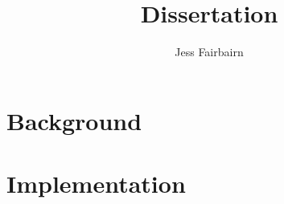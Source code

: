 \documentclass{article}
\author{Jess Fairbairn}
\title{Dissertation}
\begin{document}
        \maketitle
        \section{Background}
        
        
    
        \section{Implementation}
         

        
        
    
\end{document}
